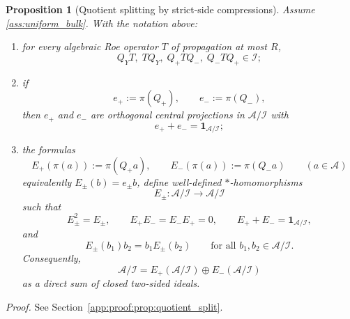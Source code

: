 \documentclass[11pt]{article}
\numberwithin{equation}{section}
\newtheorem{proposition}[theorem]{Proposition}
\theoremstyle{definition}
\theoremstyle{remark}
\newcommand{\proofref}[1]{%
  \par\noindent\emph{Proof.} See Section~\ref{#1}.\par\medskip
}
\newcommand{\proofappendixref}[1]{\proofref{#1}}
\newcommand{\Id}{\mathbf{1}}
\begin{document}
\begin{proposition}[Quotient splitting by strict-side compressions]\label{prop:quotient_split}
Assume \ref{ass:uniform_bulk}. With the notation above:
\begin{enumerate}[label=(\roman*),leftmargin=2em]
\item for every algebraic Roe operator $T$ of propagation at most $R$,
\[
Q_YT,\;TQ_Y,\;Q_+TQ_-,\;Q_-TQ_+ \in \mathcal I;
\]
\item if
\[
e_+:=\pi(Q_+),
\qquad
e_-:=\pi(Q_-),
\]
then $e_+$ and $e_-$ are orthogonal central projections in $\mathcal A/\mathcal I$ with
\[
e_++e_-=\Id_{\mathcal A/\mathcal I};
\]
\item the formulas
\[
E_+(\pi(a)):=\pi(Q_+a),
\qquad
E_-(\pi(a)):=\pi(Q_-a)
\qquad (a\in\mathcal A)
\]
equivalently $E_\pm(b)=e_\pm b$, 
define well-defined $*$-homomorphisms
\[
E_\pm:\mathcal A/\mathcal I\longrightarrow \mathcal A/\mathcal I
\]
such that
\[
E_\pm^2=E_\pm,
\qquad
E_+E_-=E_-E_+=0,
\qquad
E_+ + E_- = \Id_{\mathcal A/\mathcal I},
\]
and
\[
E_\pm(b_1)b_2=b_1E_\pm(b_2)
\qquad\text{for all }b_1,b_2\in\mathcal A/\mathcal I.
\]
Consequently,
\[
\mathcal A/\mathcal I
=
E_+(\mathcal A/\mathcal I)\oplus E_-(\mathcal A/\mathcal I)
\]
as a direct sum of closed two-sided ideals.
\end{enumerate}
\end{proposition}
\proofappendixref{app:proof:prop:quotient_split}
\end{document}
